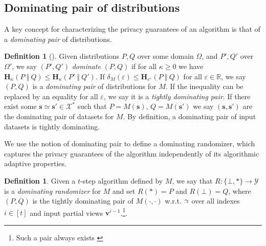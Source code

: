 \documentclass{article}
\newcommand{\NeurIPS}[1]{#1}
\newcommand{\Arxiv}[1]{}
\newcommand{\arxvFtnt}[1]{}
\newcommand{\NeurIPS}[1]{}
\newcommand{\Arxiv}[1]{#1}
\newcommand{\arxvFtnt}[1]{\footnote{#1}}
\theoremstyle{plain}
\theoremstyle{definition}
\newtheorem{definition}[theorem]{Definition}
\newcommand{\eps}{\varepsilon}
\newcommand{\reals}{\mathbb{R}}
\newcommand{\lvec}[1]{\reflectbox{$\vec{\reflectbox{$#1$}}$}}
\newcommand{\outDom}{\mathcal{Y}}
\newcommand{\alg}{M}
\newcommand{\rand}{R}
\newcommand{\domain}{\mathcal{X}}
\newcommand{\dataset}{\boldsymbol{s}}
\newcommand{\view}{\boldsymbol{v}}
\newcommand{\HockeyStick}[1]{\boldsymbol{H}_{#1}}
\newcommand{\HockeyStickDiv}[3]{\HockeyStick{#1}\left(#2 ~\left\Vert~ #3 \right. \right)}
\newcommand{\add}[1]{\lvec{#1}}
\newcommand{\rem}[1]{\vec{#1}}
\newcommand{\simRem}{\mathrel{\substack{\sim\\[-0.8ex] \scalebox{0.6}{$\rightarrow$}}}}
\newcommand{\privProf}[1]{\delta_{#1}}
\newcommand{\privProfAdd}[1]{\add{\delta}_{#1}}
\newcommand{\privProfRem}[1]{\rem{\delta}_{#1}}
\begin{document}
\subsection{Dominating pair of distributions}
A key concept for characterizing the privacy guarantees of an algorithm is that of a \emph{dominating pair} of distributions. 
\begin{definition}[\Arxiv{Dominating pair }\citep{ZDW22}] \label{def:domPair}
    Given distributions $P, Q$ over some domain $\Omega$, and $P', Q'$ over $\Omega'$, we say $(P', Q')$ \emph{dominate} $(P, Q)$ if for all $\kappa \ge 0$ we have $\HockeyStickDiv{\kappa}{P}{Q} \le \HockeyStickDiv{\kappa}{P'}{Q'}$.\arxvFtnt{The $\alpha \in [0, 1]$ regime does not correspond to useful values of $\eps$, but yet is crucial for the following guarantees, as demonstrated by \citet{LRKS24}.} If $\privProf{\alg}(\eps) \le \HockeyStickDiv{e^{\eps}}{P}{Q}$ for all $\eps \in \reals$, we say $(P, Q)$ is a \emph{dominating pair} of distributions for $\alg$. If the inequality can be replaced by an equality for all $\eps$, we say it is a \emph{tightly dominating pair}.
    If there exist some $\dataset \simeq \dataset' \in \domain^{*}$ such that $P = \alg(\dataset)$, $Q = \alg(\dataset')$ we say $(\dataset, \dataset')$ are the dominating pair of datasets for $\alg$. By definition, a dominating pair of input datasets is tightly dominating. \end{definition}

\Arxiv{
\citet{ZDW22} provide several useful properties of dominating pairs; A tightly dominating pair $(P, Q)$ always exists (Proposition 8), if $(P, Q)$ dominate $\privProfRem{\alg}$, then $(Q, P)$ dominate $\privProfAdd{\alg}$, which implies either $(P, Q)$ or $(Q, P)$ dominate $\privProf{\alg}$ (Lemma 28), and if $(P'_{i}, Q'_{i})$ dominates $(P_{i}, Q_{i})$ for $i \in \{1, 2\}$ then $(P'_{1} \times P'_{2}, Q'_{1} \times Q'_{2})$ dominates $(P_{1} \times P_{2}, Q_{1} \times Q_{2})$, where $\times$ denotes composition of the two distributions. This last result holds even when the $P_{2}, Q_{2}$, etc. are conditioned on the output of the first distribution (Theorem 10).
}
We use the notion of dominating pair to define a dominating randomizer, which captures the privacy guarantees of the algorithm independently of its algorithmic adaptive properties. 
\begin{definition}\Arxiv{[Dominating randomizer]}\label{def:domRand}
    Given a $t$-step algorithm defined by $\alg$, we say that $\rand : \{\bot, *\} \rightarrow \outDom$ is a \emph{dominating randomizer} for $\alg$ and set $\rand(*) = P$ and $\rand(\bot) = Q$, where $(P, Q)$ is the tightly dominating pair of $\alg(\cdot,\cdot)$ w.r.t. $\simRem$ over all indexes $i \in [t]$ and input partial views $\view^{i-1}$.\NeurIPS{\footnote{Such a pair always exists \citep[Proposition 8]{ZDW22}}.}
\end{definition}
\end{document}
